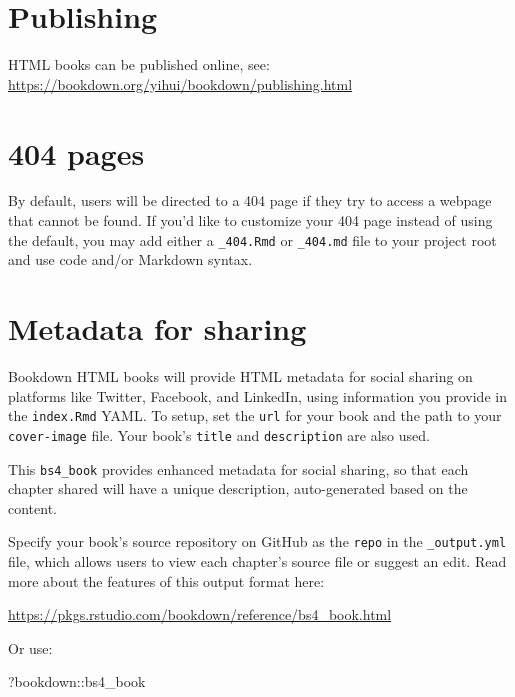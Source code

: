 \documentclass[
]{book}
\newenvironment{Shaded}{\begin{snugshade}}{\end{snugshade}}
\newcommand{\NormalTok}[1]{#1}
\newcommand{\SpecialCharTok}[1]{\textcolor[rgb]{0.00,0.00,0.00}{#1}}
\theoremstyle{definition}
\theoremstyle{definition}
\theoremstyle{definition}
\theoremstyle{definition}
\theoremstyle{remark}
\begin{document}
\hypertarget{publishing}{%
\section{Publishing}\label{publishing}}

HTML books can be published online, see: \url{https://bookdown.org/yihui/bookdown/publishing.html}

\hypertarget{pages}{%
\section{404 pages}\label{pages}}

By default, users will be directed to a 404 page if they try to access a webpage that cannot be found. If you'd like to customize your 404 page instead of using the default, you may add either a \texttt{\_404.Rmd} or \texttt{\_404.md} file to your project root and use code and/or Markdown syntax.

\hypertarget{metadata-for-sharing}{%
\section{Metadata for sharing}\label{metadata-for-sharing}}

Bookdown HTML books will provide HTML metadata for social sharing on platforms like Twitter, Facebook, and LinkedIn, using information you provide in the \texttt{index.Rmd} YAML. To setup, set the \texttt{url} for your book and the path to your \texttt{cover-image} file. Your book's \texttt{title} and \texttt{description} are also used.

This \texttt{bs4\_book} provides enhanced metadata for social sharing, so that each chapter shared will have a unique description, auto-generated based on the content.

Specify your book's source repository on GitHub as the \texttt{repo} in the \texttt{\_output.yml} file, which allows users to view each chapter's source file or suggest an edit. Read more about the features of this output format here:

\url{https://pkgs.rstudio.com/bookdown/reference/bs4_book.html}

Or use:

\begin{Shaded}
\begin{Highlighting}[]
\NormalTok{?bookdown}\SpecialCharTok{::}\NormalTok{bs4\_book}
\end{Highlighting}
\end{Shaded}


  
\end{document}
